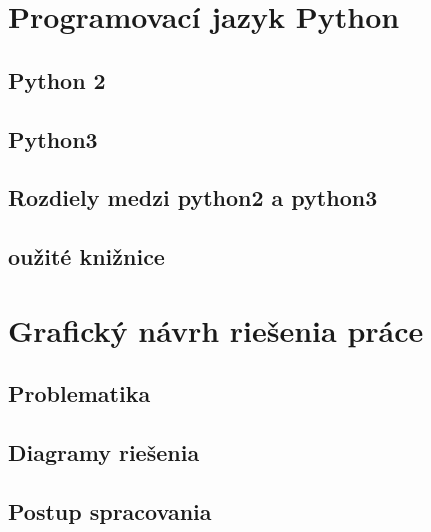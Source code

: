 \chapter{Programovací jazyk Python}
\section{Python 2}
\section{Python3}
\section{Rozdiely medzi python2 a python3}
\section{oužité knižnice}


\chapter{Grafický návrh riešenia práce}
\section{Problematika}
\section{Diagramy riešenia}
\section{Postup spracovania}